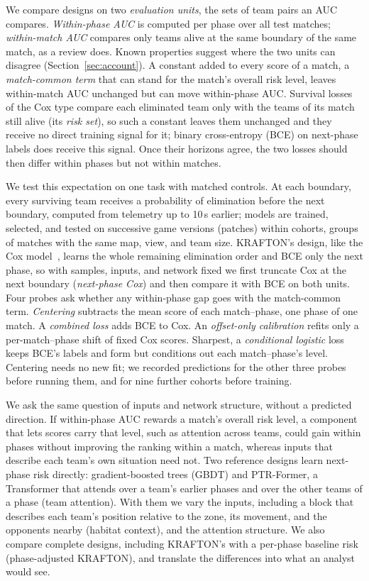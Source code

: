 \documentclass[sigconf,anonymous]{acmart}
\begin{document}
We compare designs on two \emph{evaluation units}, the sets of team pairs an AUC compares. \emph{Within-phase AUC} is computed per phase over all test matches; \emph{within-match AUC} compares only teams alive at the same boundary of the same match, as a review does. Known properties suggest where the two units can disagree (Section~\ref{sec:account}). A constant added to every score of a match, a \emph{match-common term} that can stand for the match's overall risk level, leaves within-match AUC unchanged but can move within-phase AUC. Survival losses of the Cox type compare each eliminated team only with the teams of its match still alive (its \emph{risk set}), so such a constant leaves them unchanged and they receive no direct training signal for it; binary cross-entropy (BCE) on next-phase labels does receive this signal. Once their horizons agree, the two losses should then differ within phases but not within matches.

We test this expectation on one task with matched controls. At each boundary, every surviving team receives a probability of elimination before the next boundary, computed from telemetry up to 10\,s earlier; models are trained, selected, and tested on successive game versions (patches) within cohorts, groups of matches with the same map, view, and team size. KRAFTON's design, like the Cox model~\cite{Cox72}, learns the whole remaining elimination order and BCE only the next phase, so with samples, inputs, and network fixed we first truncate Cox at the next boundary (\emph{next-phase Cox}) and then compare it with BCE on both units. Four probes ask whether any within-phase gap goes with the match-common term. \emph{Centering} subtracts the mean score of each match--phase, one phase of one match. A \emph{combined loss} adds BCE to Cox. An \emph{offset-only calibration} refits only a per-match--phase shift of fixed Cox scores. Sharpest, a \emph{conditional logistic} loss keeps BCE's labels and form but conditions out each match--phase's level. Centering needs no new fit; we recorded predictions for the other three probes before running them, and for nine further cohorts before training.

We ask the same question of inputs and network structure, without a predicted direction. If within-phase AUC rewards a match's overall risk level, a component that lets scores carry that level, such as attention across teams, could gain within phases without improving the ranking within a match, whereas inputs that describe each team's own situation need not. Two reference designs learn next-phase risk directly: gradient-boosted trees (GBDT) and PTR-Former, a Transformer that attends over a team's earlier phases and over the other teams of a phase (team attention). With them we vary the inputs, including a block that describes each team's position relative to the zone, its movement, and the opponents nearby (habitat context), and the attention structure. We also compare complete designs, including KRAFTON's with a per-phase baseline risk (phase-adjusted KRAFTON), and translate the differences into what an analyst would see.
\end{document}
